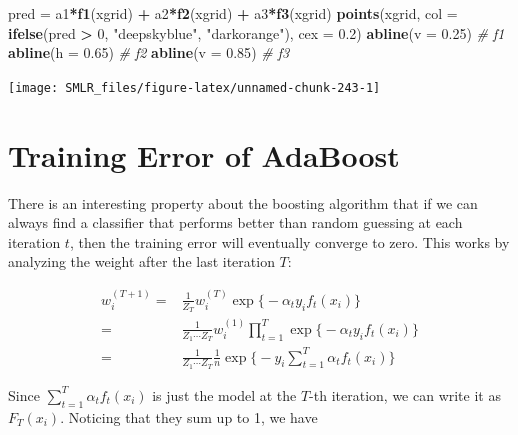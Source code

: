 \documentclass[
]{book}
\newenvironment{Shaded}{\begin{snugshade}}{\end{snugshade}}
\newcommand{\AttributeTok}[1]{\textcolor[rgb]{0.13,0.29,0.53}{#1}}
\newcommand{\CommentTok}[1]{\textcolor[rgb]{0.56,0.35,0.01}{\textit{#1}}}
\newcommand{\DecValTok}[1]{\textcolor[rgb]{0.00,0.00,0.81}{#1}}
\newcommand{\FloatTok}[1]{\textcolor[rgb]{0.00,0.00,0.81}{#1}}
\newcommand{\FunctionTok}[1]{\textcolor[rgb]{0.13,0.29,0.53}{\textbf{#1}}}
\newcommand{\NormalTok}[1]{#1}
\newcommand{\OtherTok}[1]{\textcolor[rgb]{0.56,0.35,0.01}{#1}}
\newcommand{\SpecialCharTok}[1]{\textcolor[rgb]{0.81,0.36,0.00}{\textbf{#1}}}
\newcommand{\StringTok}[1]{\textcolor[rgb]{0.31,0.60,0.02}{#1}}
\theoremstyle{definition}
\theoremstyle{definition}
\theoremstyle{definition}
\theoremstyle{definition}
\theoremstyle{remark}
\begin{document}
\begin{Shaded}
\begin{Highlighting}[]
\NormalTok{  pred }\OtherTok{=}\NormalTok{ a1}\SpecialCharTok{*}\FunctionTok{f1}\NormalTok{(xgrid) }\SpecialCharTok{+}\NormalTok{ a2}\SpecialCharTok{*}\FunctionTok{f2}\NormalTok{(xgrid) }\SpecialCharTok{+}\NormalTok{ a3}\SpecialCharTok{*}\FunctionTok{f3}\NormalTok{(xgrid)}
  \FunctionTok{points}\NormalTok{(xgrid, }\AttributeTok{col =} \FunctionTok{ifelse}\NormalTok{(pred }\SpecialCharTok{\textgreater{}} \DecValTok{0}\NormalTok{, }\StringTok{"deepskyblue"}\NormalTok{, }\StringTok{"darkorange"}\NormalTok{), }
         \AttributeTok{cex =} \FloatTok{0.2}\NormalTok{)}
  \FunctionTok{abline}\NormalTok{(}\AttributeTok{v =} \FloatTok{0.25}\NormalTok{) }\CommentTok{\# f1}
  \FunctionTok{abline}\NormalTok{(}\AttributeTok{h =} \FloatTok{0.65}\NormalTok{) }\CommentTok{\# f2}
  \FunctionTok{abline}\NormalTok{(}\AttributeTok{v =} \FloatTok{0.85}\NormalTok{) }\CommentTok{\# f3}
\end{Highlighting}
\end{Shaded}

\begin{center}\texttt{[image: SMLR\_files/figure-latex/unnamed-chunk-243-1]} \end{center}

\hypertarget{training-error-of-adaboost}{%
\section{Training Error of AdaBoost}\label{training-error-of-adaboost}}

There is an interesting property about the boosting algorithm that if we can always find a classifier that performs better than random guessing at each iteration \(t\), then the training error will eventually converge to zero. This works by analyzing the weight after the last iteration \(T\):

\begin{align}
w_i^{(T+1)} =& \frac{1}{Z_T} w_i^{(T)} \exp\big\{ - \alpha_t y_i f_t(x_i) \big\} \nonumber \\
=& \frac{1}{Z_1\cdots Z_T} w_i^{(1)} \prod_{t = 1}^T \exp\big\{ - \alpha_t y_i f_t(x_i) \big\} \nonumber \\
=& \frac{1}{Z_1\cdots Z_T} \frac{1}{n} \exp\Big\{ - y_i \sum_{t = 1}^T \alpha_t f_t(x_i) \Big\}
\end{align}

Since \(\sum_{t = 1}^T \alpha_t f_t(x_i)\) is just the model at the \(T\)-th iteration, we can write it as \(F_T(x_i)\). Noticing that they sum up to 1, we have
\end{document}
